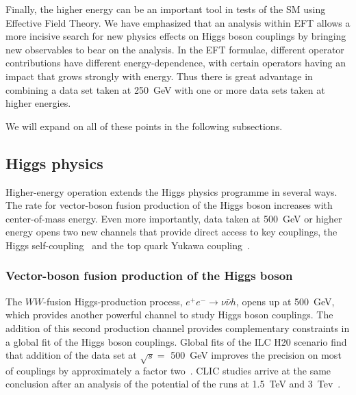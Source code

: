 Finally, the higher energy can be an important tool in tests of the SM
using Effective Field Theory.   We have emphasized that an analysis
within  EFT allows a more incisive search for new physics effects on
Higgs boson couplings by bringing new observables to bear on  the
analysis.  In the EFT formulae, different operator contributions have different
energy-dependence, with certain operators having an impact that grows 
strongly with energy.  Thus there is great advantage in combining a
data set taken at 250~GeV with one or more data sets taken at higher
energies.

We will expand on all of these points in the following subsections.




\subsection{Higgs physics}
\label{subsec:highE:Higgs}

Higher-energy operation extends the Higgs physics programme in several ways.
The rate for vector-boson fusion production of the Higgs boson increases with
center-of-mass energy. Even more importantly, data taken
at 500~GeV or higher energy opens two new channels that provide direct
access to key couplings, the Higgs self-coupling~\cite{Barklow:2017awn}
and the top quark Yukawa coupling~\cite{Yonamine:2011jg}.

\subsubsection{Vector-boson fusion production of the Higgs boson}
\label{subsubsec:highE:VBFHiggs}

The $WW$-fusion Higgs-production process,
$e^+e^- \rightarrow \nu \bar{\nu} h$, opens up at 500~GeV, which
provides another powerful channel to study Higgs boson couplings. The
addition of this second production channel provides complementary
constraints in a global fit of the Higgs boson couplings.
Global fits of the ILC H20 scenario find that addition of the data
set at $\sqrt{s}=$ 500~GeV improves the precision on most of
couplings by approximately a factor two~\cite{Barklow:2017suo}.
CLIC studies arrive at the same conclusion after an analysis of
the potential of the runs at 1.5~TeV  and
3~Tev~\cite{Abramowicz:2016zbo}.

